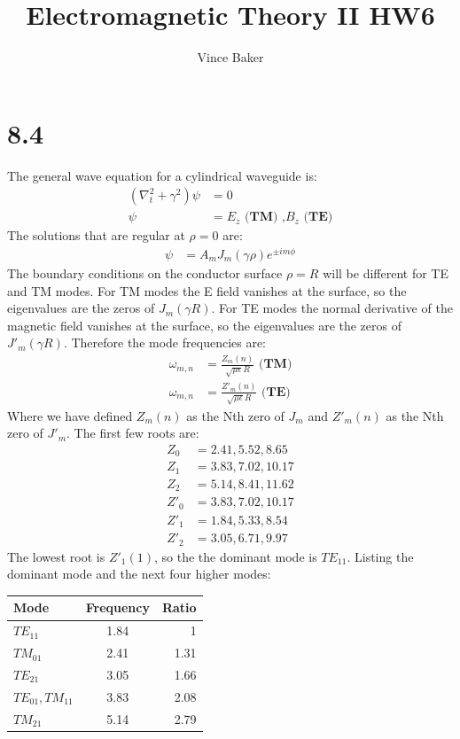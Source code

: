 \documentclass[a4paper,11pt]{article}
\title{Electromagnetic Theory II HW6}
\author{Vince Baker}
\numberwithin{equation}{section}
\newcommand{\lrp}[1]{\left({#1}\right)}
\begin{document}
\maketitle

\section*{8.4}
The general wave equation for a cylindrical waveguide is:
\begin{align}
 \lrp{\nabla_t^2+\gamma^2}\psi &= 0\\
 \psi &= E_z\textbf{ (TM) ,}B_z\textbf{ (TE)}
\end{align}
The solutions that are regular at $\rho=0$ are:
\begin{align}
 \psi &= A_m J_m(\gamma\rho)e^{\pm im\phi}
\end{align}
The boundary conditions on the conductor surface $\rho=R$ will be different for TE and TM modes.
For TM modes the E field vanishes at the surface, so the eigenvalues are the zeros of $J_m(\gamma R)$.
For TE modes the normal derivative of the magnetic field vanishes at the surface, so the eigenvalues are the zeros of $J'_m(\gamma R)$.
Therefore the mode frequencies are:
\begin{align}
 \omega_{m,n} &= \frac{Z_m(n)}{\sqrt{\mu\epsilon}R}\textbf{ (TM)}\\
 \omega_{m,n} &= \frac{Z'_m(n)}{\sqrt{\mu\epsilon}R}\textbf{ (TE)}
\end{align}
Where we have defined $Z_m(n)$ as the Nth zero of $J_m$ and $Z'_m(n)$ as the Nth zero of $J'_m$. 
The first few roots are:
\begin{align}
 Z_0 &= 2.41, 5.52, 8.65\\
 Z_1 &= 3.83, 7.02, 10.17\\
 Z_2 &= 5.14, 8.41, 11.62\\
 Z'_0 &= 3.83, 7.02, 10.17\\
 Z'_1 &= 1.84, 5.33, 8.54\\
 Z'_2 &= 3.05, 6.71, 9.97
\end{align}
The lowest root is $Z'_1(1)$, so the the dominant mode is $TE_{11}$. 
Listing the dominant mode and the next four higher modes:
\begin{tabular}{l | c | r}
 Mode & Frequency & Ratio\\
 \hline
 $TE_{11}$ & 1.84  & 1\\
 $TM_{01}$ & 2.41  & 1.31 \\
 $TE_{21}$ & 3.05 & 1.66\\
 $TE_{01},TM_{11}$ & 3.83 & 2.08\\
 $TM_{21}$ & 5.14 & 2.79
\end{tabular}
\end{document}
